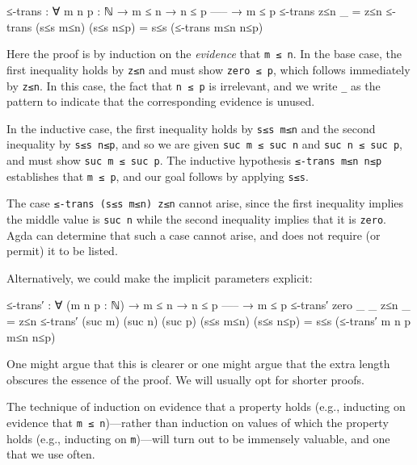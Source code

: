 \begin{fence}
\begin{code}
≤-trans : ∀ {m n p : ℕ}
  → m ≤ n
  → n ≤ p
    -----
  → m ≤ p
≤-trans z≤n       _          =  z≤n
≤-trans (s≤s m≤n) (s≤s n≤p)  =  s≤s (≤-trans m≤n n≤p)
\end{code}
\end{fence}

Here the proof is by induction on the \emph{evidence} that
\texttt{m\ ≤\ n}. In the base case, the first inequality holds by
\texttt{z≤n} and must show \texttt{zero\ ≤\ p}, which follows
immediately by \texttt{z≤n}. In this case, the fact that
\texttt{n\ ≤\ p} is irrelevant, and we write \texttt{\_} as the pattern
to indicate that the corresponding evidence is unused.

In the inductive case, the first inequality holds by \texttt{s≤s\ m≤n}
and the second inequality by \texttt{s≤s\ n≤p}, and so we are given
\texttt{suc\ m\ ≤\ suc\ n} and \texttt{suc\ n\ ≤\ suc\ p}, and must show
\texttt{suc\ m\ ≤\ suc\ p}. The inductive hypothesis
\texttt{≤-trans\ m≤n\ n≤p} establishes that \texttt{m\ ≤\ p}, and our
goal follows by applying \texttt{s≤s}.

The case \texttt{≤-trans\ (s≤s\ m≤n)\ z≤n} cannot arise, since the first
inequality implies the middle value is \texttt{suc\ n} while the second
inequality implies that it is \texttt{zero}. Agda can determine that
such a case cannot arise, and does not require (or permit) it to be
listed.

Alternatively, we could make the implicit parameters explicit:

\begin{fence}
\begin{code}
≤-trans′ : ∀ (m n p : ℕ)
  → m ≤ n
  → n ≤ p
    -----
  → m ≤ p
≤-trans′ zero    _       _       z≤n       _          =  z≤n
≤-trans′ (suc m) (suc n) (suc p) (s≤s m≤n) (s≤s n≤p)  =  s≤s (≤-trans′ m n p m≤n n≤p)
\end{code}
\end{fence}

One might argue that this is clearer or one might argue that the extra
length obscures the essence of the proof. We will usually opt for
shorter proofs.

The technique of induction on evidence that a property holds (e.g.,
inducting on evidence that \texttt{m\ ≤\ n})---rather than induction on
values of which the property holds (e.g., inducting on
\texttt{m})---will turn out to be immensely valuable, and one that we
use often.

